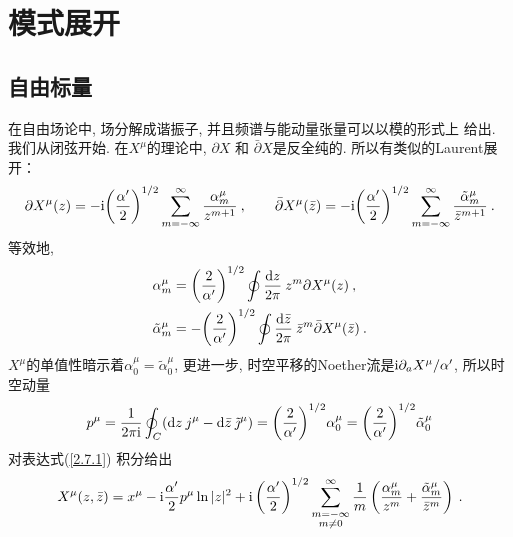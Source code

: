 \section{\texorpdfstring{模式展开}{2.7 Mode expansions}} \label{sec:2.7}

\subsection*{自由标量}
在自由场论中, 场分解成谐振子, 并且频谱与能动量张量可以以模的形式上
给出. 我们从闭弦开始. 在$X^\mu$的理论中,  $\partial X$ 和 $\bar{\partial} X$是反全纯的. 所以有类似的Laurent展开：
\begin{equation}\label{2.7.1}
\partial X^{\mu}(z)=-\mathrm{i}\biggl(\frac{\alpha^{\prime}}{2}\biggr)^{1 / 2} \sum_{m=-\infty}^{\infty} \frac{\alpha_{m}^{\mu}}{z^{m+1}}\:, \qquad 
\bar{\partial} X^{\mu}(\bar{z})=-\mathrm{i}\biggl(\frac{\alpha^{\prime}}{2}\biggr)^{1 / 2} \sum_{m=-\infty}^{\infty} \frac{\tilde{\alpha}_{m}^{\mu}}{\bar{z}^{m+1}} \:.
\end{equation}
等效地, 
\begin{subequations}\label{2.7.2}
\begin{align}
\alpha_{m}^{\mu}&=\biggl(\frac{2}{\alpha^{\prime}}\biggr)^{1 / 2} \oint \frac{\mathrm{d} z}{2 \pi}\: z^{m} \partial X^{\mu}(z) \:, \label{2.7.2a} \\
\tilde{\alpha}_{m}^{\mu}&=-\biggl(\frac{2}{\alpha^{\prime}}\biggr)^{1 / 2} \oint \frac{\mathrm{d} \bar{z}}{2 \pi} \: \bar{z}^{m} \bar{\partial} X^{\mu}(\bar{z}) \:. \label{2.7.2b}
\end{align}
\end{subequations}
$X^\mu$的单值性暗示着$\alpha_{0}^{\mu}=\tilde{\alpha}_{0}^{\mu}$, 更进一步, 时空平移的Noether流是$\mathrm{i} \partial_{a} X^{\mu} / \alpha^{\prime}$, 
所以时空动量
\begin{equation}\label{2.7.3}
p^{\mu}=\frac{1}{2 \pi \mathrm{i}} \oint_{C} (\mathrm{d} z \: j^{\mu}-\mathrm{d} \bar{z}\: \tilde{\jmath}^{\mu})
=\biggl(\frac{2}{\alpha^{\prime}}\biggr)^{1 / 2} \alpha_{0}^{\mu}=\biggl(\frac{2}{\alpha^{\prime}}\biggr)^{1 / 2} \tilde{\alpha}_{0}^{\mu}
\end{equation}
对表达式(\ref{2.7.1}) 积分给出
\begin{equation}
X^{\mu}(z, \bar{z})=x^{\mu}- \mathrm{i} \frac{\alpha^{\prime}}{2} p^{\mu} \ln |z|^{2}+\mathrm{i}\left(\frac{\alpha^{\prime}}{2}\right)^{1 / 2} \sum_{\substack{m=-\infty  \\  m \neq 0}}^{\infty} \frac{1}{m}\left(\frac{\alpha_{m}^{\mu}}{z^{m}}+\frac{\tilde{\alpha}_{m}^{\mu}}{\bar{z}^{m}}\right) \:.
\end{equation}
